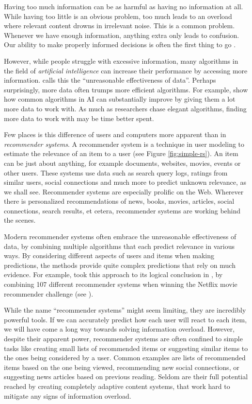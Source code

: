 \label{chap:intro}

Having too much information can be as harmful as having no information at all.
While having too little is an obvious problem,
too much leads to an overload where relevant content drowns in irrelevant noise.
This is a common problem. Whenever we have enough information,
anything extra only leads to confusion.
Our ability to make properly informed decisions is often the first thing to go
\cite[p1]{Davenport2001}.

However, while people struggle with excessive information,
many algorithms in the field of \emph{artificial intelligence}  
can increase their performance by accessing more information.
\citet[p1]{Halevy2009} calls this the ``unreasonable effectiveness of data''.
Perhaps surprisingly, more data often trumps more efficient algorithms.
For example, \citet[p3]{Banko2001} show how common algorithms in AI 
can substantially improve by giving them a lot more data to work with.
As much as researchers chase elegant algorithms, finding more data to work with may be time better spent.

Few places is this difference of users and computers more apparent than in \emph{recommender systems}.
A recommender system is a technique in user modeling to estimate the relevance of an item to a user
(see Figure \ref{fig:simple-rs}).
An item can be just about anything, for example documents, websites, movies, events or other users.
These systems use data such as search query logs, 
ratings from similar users, social connections and much more
to predict unknown relevance, as we shall see.
Recommender systems are especially prolific on the Web. 
Wherever there is personalized recommendations of news, books, movies,
articles, social connections, search results, et cetera, recommender systems are working behind the scenes.

Modern recommender systems often embrace the 
unreasonable effectiveness of data,
by combining multiple algorithms that each predict relevance in various ways.
By considering different aspects of users and items when making predictions,
the methods provide quite complex predictions that rely on much evidence.
For example, \citeauthor{Bell2007} took this approach to its logical conclusion in \citet[p1]{Bell2007}, by 
combining 107 different recommender systems when winning the 
Netflix movie recommender challenge
(see \citet{Linden2009}).

While the name ``recommender systems'' might seem limiting, they are incredibly powerful tools.
If we can accurately predict how each user will react to each item,
we will have come a long way towards solving information overload.
However, despite their apparent power, recommender systems are often confined
to simple tasks like creating small lists of recommended items
or suggesting similar items to the ones being considered by a user.
Common examples are lists of recommended items based on the one being viewed, 
recommending new social connections, or suggesting news articles based on previous reading.
Seldom are their full potential reached by creating completely adaptive
content systems, that work hard to mitigate any signs of information overload.

